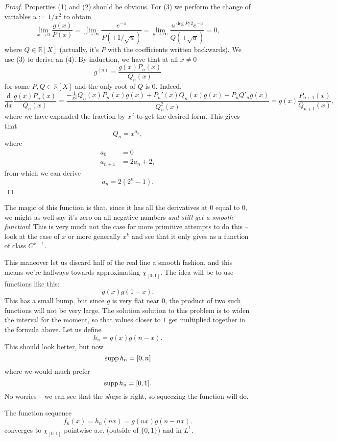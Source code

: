 \begin{proof}
    Properties (1) and (2) should be obvious. For (3) we perform the change of variables \( u := 1/x^2 \) to obtain
    \[ 
        \lim\limits_{x \to 0} \frac{g(x)}{P(x)} = \lim\limits_{u \to \infty} \frac{e^{-u}}{P(\pm 1/\sqrt{u})} = \lim\limits_{u \to \infty}\frac{u^{\deg P / 2} e^{-u}}{Q(\pm\sqrt{u})} = 0,
   \]
   where \( Q \in \mathbb{R}[X] \) (actually, it's \( P \) with the coefficients written backwards). We use (3) to derive an (4). By induction, we have that at all \( x \neq 0 \)
   \[ 
       g^{(n)} = \frac{g(x)P_n(x)}{Q_n(x)} 
  \]
  for some \( P, Q \in \mathbb{R}[X] \) and the only root of \( Q \) is \( 0 \). Indeed,
  \[ 
      \frac{\mathrm{d}}{\mathrm{d}x}  \frac{g(x)P_n(x)}{Q_n(x)} = \frac{ -\frac{1}{x^2}Q_n(x)P_n(x)g(x) + P_n'(x)Q_n(x)g(x) - P_nQ'_n g(x) }{Q^2_n(x)} = g(x) \frac{P_{n+1}(x)}{Q_{n+1}(x)},
 \]
where we have expanded the fraction by \( x^2 \) to get the desired form. This gives that
 \[ 
     Q_n = x^{a_n},
\]
where
\begin{align*}
    a_0 &= 0 \\
    a_{n+1} &= 2a_n + 2,
\end{align*}
from which we can derive
\[ 
    a_n = 2(2^n - 1). 
\]
\end{proof}

The magic of this function is that, since it has all the derivatives at \( 0 \) equal to \( 0 \), we might as well say it's zero on all negative numbers \emph{and still get a smooth function}! This is very much not the case for more primitive attempts to do this -- look at the case of \( x \) or more generally \( x^k \) and see that it only gives as a function of class \( C^{k-1} \).

This maneover let us discard half of the real line a smooth fashion, and this means we're halfways towards approximating \( \chi_{[0,1]} \). The idea will be to use functions like this:
\[ 
    g(x)g(1-x).
\]
This has a small bump, but since \( g \) is very flat near \( 0 \), the product of two such functions will not be very large. The solution solution to this problem is to widen the interval for the moment, so that values closer to \( 1 \) get multiplied together in the formula above. Let us define
\[ 
    h_n = g(x)g(n-x).
\]
This should look better, but now
\[ 
    \operatorname{supp} h_n = [0,n] 
\]
where we would much prefer
\[ 
    \operatorname{supp} h_n = [0,1].
\]
No worries -- we can see that the \emph{shape} is right, so squeezing the function will do.

\begin{lemma}
    The function sequence  
    \[ 
        f_n(x) = h_n(nx) = g(nx)g(n - nx). 
    \]
    converges to \( \chi_{[0,1]} \) pointwise a.e. (outside of \( \{0,1\} \)) and in \( L^1 \).
\end{lemma}

